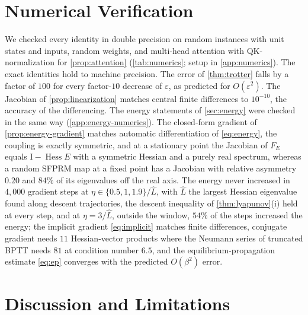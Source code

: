 \documentclass{article}
\theoremstyle{plain}
\theoremstyle{definition}
\theoremstyle{remark}
\newcommand{\Id}{\mathrm{I}}
\begin{document}


\section{Numerical Verification}
\label{sec:numerics}



We checked every identity in double precision on random instances with unit states and inputs, random
weights, and multi-head attention with QK-normalization for \cref{prop:attention}
(\cref{tab:numerics}; setup in \cref{app:numerics}). The exact identities hold to machine precision.
The error of \cref{thm:trotter} falls by a factor of $100$ for every factor-$10$ decrease of
$\varepsilon$, as predicted for $O(\varepsilon^2)$. The Jacobian of \cref{prop:linearization} matches
central finite differences to $10^{-10}$, the accuracy of the differencing.
The energy statements of \cref{sec:energy} were checked in the same way (\cref{app:energy-numerics}).
The closed-form gradient of \cref{prop:energy-gradient} matches automatic differentiation of
\eqref{eq:energy}, the coupling is exactly symmetric, and at a stationary point the Jacobian of
$F_E$ equals $\Id-\operatorname{Hess}E$ with a symmetric Hessian and a purely real spectrum,
whereas a random SFPRM map at a fixed point has a Jacobian with relative asymmetry $0.20$ and
$84\%$ of its eigenvalues off the real axis. The energy never increased in $4{,}000$ gradient
steps at $\eta\in\{0.5,1,1.9\}/\hat L$, with $\hat L$ the largest Hessian eigenvalue found along
descent trajectories, the descent inequality of \cref{thm:lyapunov}(i) held at every step, and
at $\eta=3/\hat L$, outside the window, $54\%$ of the steps increased the energy; the implicit gradient
\eqref{eq:implicit} matches finite differences, conjugate gradient needs $11$ Hessian-vector
products where the Neumann series of truncated BPTT needs $81$ at condition number $6.5$, and the
equilibrium-propagation estimate \eqref{eq:ep} converges with the predicted $O(\beta^2)$ error.

\section{Discussion and Limitations}
\label{sec:discussion}
\end{document}
